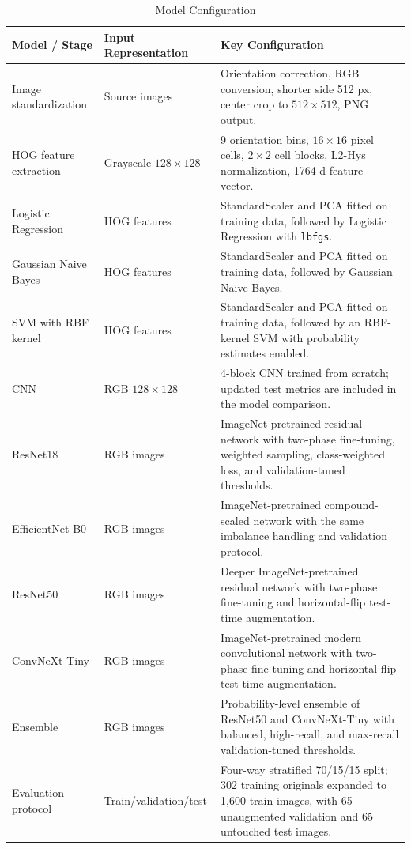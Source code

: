 \documentclass[conference]{IEEEtran}
\begin{document}
\begin{table}[!t]
\centering
\caption{Model Configuration}
\label{tab:model_config}
\footnotesize
\begin{tabularx}{\textwidth}{l l X}
\toprule
\textbf{Model / Stage} & \textbf{Input Representation} & \textbf{Key Configuration} \\
\midrule
Image standardization & Source images & Orientation correction, RGB conversion, shorter side 512 px, center crop to $512\times512$, PNG output. \\
HOG feature extraction & Grayscale $128\times128$ & 9 orientation bins, $16\times16$ pixel cells, $2\times2$ cell blocks, L2-Hys normalization, 1764-d feature vector. \\
Logistic Regression & HOG features & StandardScaler and PCA fitted on training data, followed by Logistic Regression with \texttt{lbfgs}. \\
Gaussian Naive Bayes & HOG features & StandardScaler and PCA fitted on training data, followed by Gaussian Naive Bayes. \\
SVM with RBF kernel & HOG features & StandardScaler and PCA fitted on training data, followed by an RBF-kernel SVM with probability estimates enabled. \\
CNN & RGB $128\times128$ & 4-block CNN trained from scratch; updated test metrics are included in the model comparison. \\
ResNet18 & RGB images & ImageNet-pretrained residual network with two-phase fine-tuning, weighted sampling, class-weighted loss, and validation-tuned thresholds. \\
EfficientNet-B0 & RGB images & ImageNet-pretrained compound-scaled network with the same imbalance handling and validation protocol. \\
ResNet50 & RGB images & Deeper ImageNet-pretrained residual network with two-phase fine-tuning and horizontal-flip test-time augmentation. \\
ConvNeXt-Tiny & RGB images & ImageNet-pretrained modern convolutional network with two-phase fine-tuning and horizontal-flip test-time augmentation. \\
Ensemble & RGB images & Probability-level ensemble of ResNet50 and ConvNeXt-Tiny with balanced, high-recall, and max-recall validation-tuned thresholds. \\
Evaluation protocol & Train/validation/test & Four-way stratified 70/15/15 split; 302 training originals expanded to 1,600 train images, with 65 unaugmented validation and 65 untouched test images. \\
\bottomrule
\end{tabularx}
\end{table}
\end{document}

